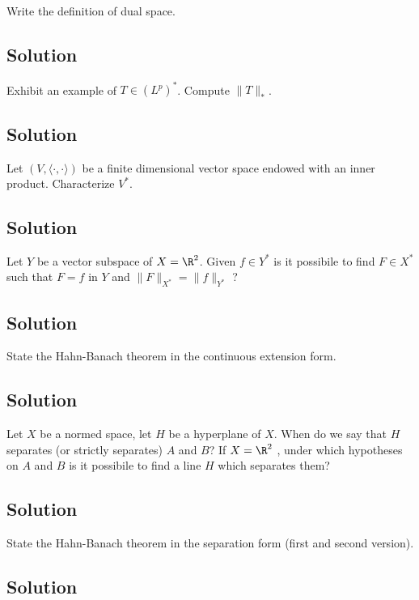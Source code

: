 
\question
Write the definition of dual space.

\subsection*{Solution}


\question
Exhibit an example of $T \in (L^p)^{*}$. Compute $\|T\|_{*}$.

\subsection*{Solution}


\question
Let $(V, \langle \cdot, \cdot \rangle)$ be a finite dimensional vector space endowed with an inner product. Characterize $V^{*}$.

\subsection*{Solution}


\question
Let $Y$ be a vector subspace of $X = \R^2$. Given $f \in Y^{*}$ is it possibile to find $F \in X^{*}$ such that $F = f$ in $Y$ and $\|F\|_{X^{*}} = \|f\|_{Y^{*}}$ ?

\subsection*{Solution}


\question
State the Hahn-Banach theorem in the continuous extension form.

\subsection*{Solution}


\question
Let $X$ be a normed space, let $H$ be a hyperplane of $X$. When do we say that $H$ separates (or strictly separates) $A$ and $B$? If $X = \R^2$ , under which hypotheses on $A$ and $B$ is it possibile to find a line $H$ which separates them?

\subsection*{Solution}


\question
State the Hahn-Banach theorem in the separation form (first and second version).

\subsection*{Solution}
